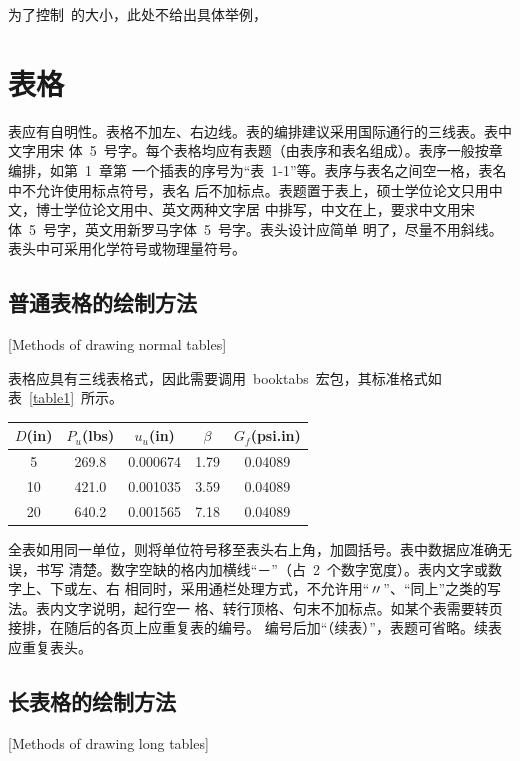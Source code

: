 为了控制\heuthesis\ 的大小，此处不给出具体举例，

\section{表格}

表应有自明性。表格不加左、右边线。表的编排建议采用国际通行的三线表。表中文字用宋
体~5~号字。每个表格均应有表题（由表序和表名组成）。表序一般按章编排，如第~1~章第
一个插表的序号为“表~1-1”等。表序与表名之间空一格，表名中不允许使用标点符号，表名
后不加标点。表题置于表上，硕士学位论文只用中文，博士学位论文用中、英文两种文字居
中排写，中文在上，要求中文用宋体~5~号字，英文用新罗马字体~5~号字。表头设计应简单
明了，尽量不用斜线。表头中可采用化学符号或物理量符号。


\subsection{普通表格的绘制方法}[Methods of drawing normal tables]

表格应具有三线表格式，因此需要调用~booktabs~宏包，其标准格式如表~\ref{table1}~所示。
\begin{table}[htbp]
  \vspace{0.5em}\centering\wuhao
  \begin{tabular}{ccccc}
    \toprule[1.5pt]
    $D$(in) & $P_u$(lbs) & $u_u$(in) & $\beta$ & $G_f$(psi.in) \\
    \midrule[1pt]
    5       & 269.8      & 0.000674  & 1.79    & 0.04089       \\
    10      & 421.0      & 0.001035  & 3.59    & 0.04089       \\
    20      & 640.2      & 0.001565  & 7.18    & 0.04089       \\
    \bottomrule[1.5pt]
  \end{tabular}
\end{table}
全表如用同一单位，则将单位符号移至表头右上角，加圆括号。表中数据应准确无误，书写
清楚。数字空缺的格内加横线“－”（占~2~个数字宽度）。表内文字或数字上、下或左、右
相同时，采用通栏处理方式，不允许用“〃”、“同上”之类的写法。表内文字说明，起行空一
格、转行顶格、句末不加标点。如某个表需要转页接排，在随后的各页上应重复表的编号。
编号后加“（续表）”，表题可省略。续表应重复表头。

\subsection{长表格的绘制方法}[Methods of drawing long tables]

